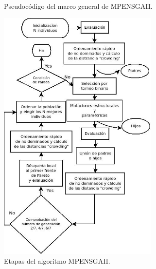 \begin{figure}[!htp]
\centering
{}
\caption{Pseudocódigo del marco general de MPENSGAII.}
\label{marcoMPENSGAII}
\end{figure}

\newpage

 \begin{figure}[!htp]
\centering
\includegraphics[keepaspectratio,width=8cm]{figuras/etapasMPENSGAII.jpg}
\caption{Etapas del algoritmo MPENSGAII.}
\label{etapasMPENSGAII}
\end{figure}

